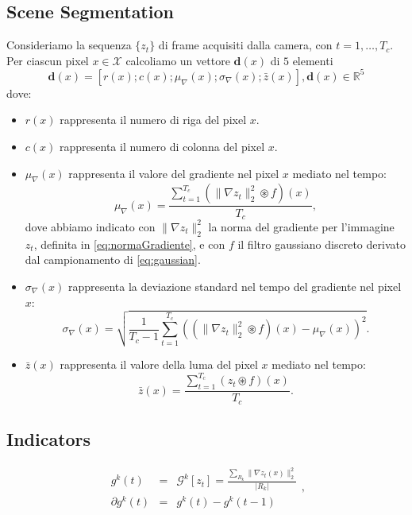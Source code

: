 \documentclass{llncs}
\begin{document}
\subsection{Scene Segmentation}\label{subsec:Segmentation}
Consideriamo la sequenza $\{z_t\}$ di frame acquisiti dalla camera, con $t=1,\dots,T_{c}$.
Per ciascun pixel $x\in\mathcal{X}$ calcoliamo un vettore $\textbf{d}(x)$ di $5$ elementi
\begin{equation}
\label{eq:featureVector}
\textbf{d}(x)=\left[r(x);c(x);\mu_{\nabla}(x);\sigma_{\nabla}(x);\bar{z}(x)\right], \textbf{d}(x) \in \mathbb{R}^5
\end{equation}
dove:
\begin{itemize}
	\item $r(x)$ rappresenta il numero di riga del pixel $x$.
	\item $c(x)$ rappresenta il numero di colonna del pixel $x$.
	\item $\mu_{\nabla}(x)$ rappresenta il valore del gradiente nel pixel $x$ mediato nel tempo:
	\begin{equation}
	\label{eq:segmentazioneGrad}
	\mu_{\nabla}(x) = \frac{\sum_{t=1}^{T_c}(\|\nabla z_t\|_2^2 \circledast f)(x)}{T_c},
	\end{equation}
	dove abbiamo indicato con $\|\nabla z_t\|_2^2$ la norma del gradiente per l'immagine $z_t$, definita in \eqref{eq:normaGradiente}, e con $f$ il filtro gaussiano discreto derivato dal campionamento di \eqref{eq:gaussian}.
	\item $\sigma_{\nabla}(x)$ rappresenta la deviazione standard nel tempo del gradiente nel pixel $x$:
	\begin{equation}
	\label{eq:segmentazioneVar}
	\sigma_{\nabla}(x)=\sqrt{\frac{1}{T_c - 1}\sum_{t=1}^{T_c}\left(\left(\|\nabla z_t\|_2^2 \circledast f\right)(x)-\mu_{\nabla}(x)\right)^2}.
	\end{equation}
	\item $\bar{z}(x)$ rappresenta il valore della luma del pixel $x$ mediato nel tempo:
	\begin{equation}
	\label{eq:segmentazioneLuma}
	\bar{z}(x)=\frac{\sum_{t=1}^{T_c}( z_t \circledast f)(x)}{T_c}.
	\end{equation}
\end{itemize}
%
%
%
\subsection{Indicators}\label{subsec:Indicators}

\begin{equation}
\label{eq:gradientRegions}
\begin{array}{ccc}
g^k(t)&  = & \mathcal{G}^k[z_t] = \frac{\sum_{R_k}\| \nabla z_t(x) \| _2^2 }{|{R_k}|}\\
\partial g^k(t) & =& g^k(t)-g^k(t-1) 
\end{array},
\end{equation}
\end{document}

